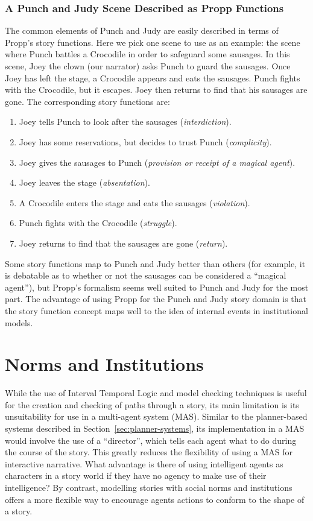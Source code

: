 \documentclass[11pt]{report}
\begin{document}
\subsubsection{A Punch and Judy Scene Described as Propp Functions}\label{sec:pjexample}
The common elements of Punch and Judy are easily described in terms of Propp's story functions. Here we pick one scene to use as an example: the scene where Punch battles a Crocodile in order to safeguard some sausages.  In this scene, Joey the clown (our narrator) asks Punch to guard the sausages. Once Joey has left the stage, a Crocodile appears and eats the sausages. Punch fights with the Crocodile, but it escapes. Joey then returns to find that his sausages are gone.
The corresponding story functions are:
\begin{enumerate}
  \item Joey tells Punch to look after the sausages (\emph{interdiction}).
  \item Joey has some reservations, but decides to trust Punch (\emph{complicity}).
  \item Joey gives the sausages to Punch (\emph{provision or receipt of a magical agent}).
  \item Joey leaves the stage (\emph{absentation}).
  \item A Crocodile enters the stage and eats the sausages (\emph{violation}).
  \item Punch fights with the Crocodile (\emph{struggle}).
  \item Joey returns to find that the sausages are gone (\emph{return}).
\end{enumerate}

Some story functions map to Punch and Judy better than others (for example, it is debatable as to whether or not the sausages can be considered a ``magical agent''), but Propp's formalism seems well suited to Punch and Judy for the most part. The advantage of using Propp for the Punch and Judy story domain is that the story function concept maps well to the idea of internal events in institutional models.

\section{Norms and Institutions}
\label{sec:norms-and-institutions}

While the use of Interval Temporal Logic and model checking techniques is useful
for the creation and checking of paths through a story, its main limitation is
its unsuitability for use in a multi-agent system (MAS). Similar to the
planner-based systems described in Section~\ref{sec:planner-systems}, its implementation in a MAS
would involve the use of a ``director'', which tells each agent what to do
during the course of the story. This greatly reduces the flexibility of using a
MAS for interactive narrative. What advantage is there of using intelligent
agents as characters in a story world if they have no agency to make use of
their intelligence? By contrast, modelling stories with social norms and
institutions offers a more flexible way to encourage agents actions to conform
to the shape of a story.
\end{document}
